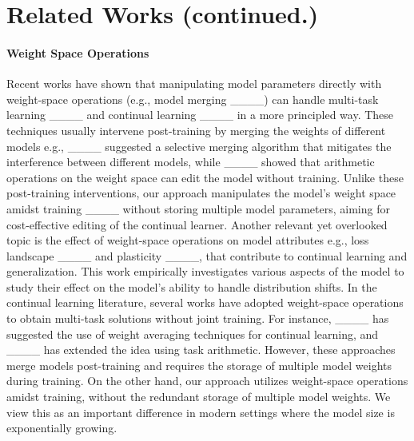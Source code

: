 \section{Related Works (continued.)}
\label{appendix:related-works}

\paragraph{Weight Space Operations} Recent works have shown that manipulating model parameters directly with weight-space operations (e.g., model merging ____) can handle multi-task learning ____ and continual learning ____ in a more principled way. These techniques usually intervene post-training by merging the weights of different models e.g., ____ suggested a selective merging algorithm that mitigates the interference between different models, while ____ showed that arithmetic operations on the weight space can edit the model without training. Unlike these post-training interventions, our approach manipulates the model's weight space amidst training ____ without storing multiple model parameters, aiming for cost-effective editing of the continual learner. Another relevant yet overlooked topic is the effect of weight-space operations on model attributes e.g., loss landscape ____ and plasticity ____, that contribute to continual learning and generalization. This work empirically investigates various aspects of the model to study their effect on the model's ability to handle distribution shifts. In the continual learning literature, several works have adopted weight-space operations to obtain multi-task solutions without joint training. For instance, ____ has suggested the use of weight averaging techniques for continual learning, and ____ has extended the idea using task arithmetic. However, these approaches merge models post-training and requires the storage of multiple model weights during training. On the other hand, our approach utilizes weight-space operations amidst training, without the redundant storage of multiple model weights. We view this as an important difference in modern settings where the model size is exponentially growing.